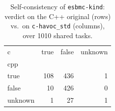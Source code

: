 \begin{table}[t]
  \centering
  \caption{Self-consistency of \texttt{esbmc-kind}: verdict on the C++ original (rows) vs.\ on \texttt{c-havoc_std} (columns), over 1010 shared tasks.}
  \label{tab:selfpair-esbmc-kind-c-havoc_std}
\begin{tabular}{lrrr}
\toprule
c & true & false & unknown \\
cpp &  &  &  \\
\midrule
true & 108 & 436 & 1 \\
false & 10 & 426 & 0 \\
unknown & 1 & 27 & 1 \\
\bottomrule
\end{tabular}
\end{table}

